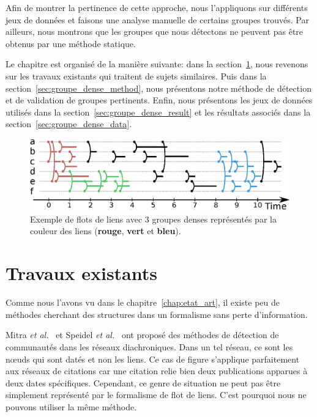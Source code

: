 Afin de montrer la pertinence de cette approche, nous l'appliquons sur différents jeux de données et faisons une analyse manuelle de certains groupes trouvés.
Par ailleurs, nous montrons que les groupes que nous détectons ne peuvent pas être obtenus par une méthode statique.

Le chapitre est organisé de la manière suivante:
dans la section~\ref{sec:groupe_dense_existant}, nous revenons sur les travaux existants qui traitent de sujets similaires.
Puis dans la section~\ref{sec:groupe_dense_method}, nous présentons notre méthode de détection et de validation de groupes pertinents.
Enfin, nous présentons les jeux de données utilisés dans la section~\ref{sec:groupe_dense_result} et les résultats associés dans la section~\ref{sec:groupe_dense_data}.

\begin{figure}
\centering
\includegraphics[width=\linewidth]{img/GroupeDense/GroupExample/Zone_dense.eps}
\caption{Exemple de flots de liens avec 3 groupes denses représentés par la couleur des liens (\textcolor{brique}{\textbf{rouge}}, \textcolor{vert_turquoise}{\textbf{vert}} et \textcolor{bleu_window}{\textbf{bleu}}).
}
\label{fig:exemple_groupe_dens}
\end{figure}

\section{Travaux existants}
\label{sec:groupe_dense_existant}

Comme nous l'avons vu dans le chapitre~\ref{chap:etat_art}, il existe peu de méthodes cherchant des structures dans un formalisme sans perte d'information.

Mitra \emph{et al.}~\cite{Mitra2012a} et Speidel \emph{et al.}~\cite{Speidel2015} ont proposé des méthodes de détection de communautés dans les réseaux diachroniques.
Dans un tel réseau, ce sont les n\oe{}uds qui sont datés et non les liens.
Ce cas de figure s'applique parfaitement aux réseaux de citations car une citation relie bien deux publications apparues à deux dates spécifiques.
Cependant, ce genre de situation ne peut pas être simplement représenté par le formalisme de flot de liens.
C'est pourquoi nous ne pouvons utiliser la même méthode. 


